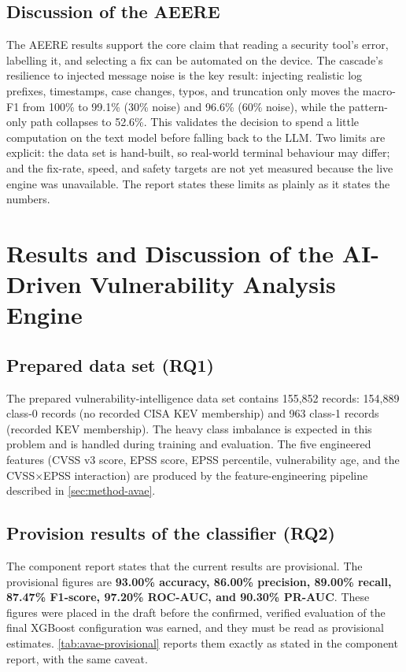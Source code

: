 \subsection{Discussion of the AEERE}\label{sec:results-aeere-discussion}

The AEERE results support the core claim that reading a security tool's error,
labelling it, and selecting a fix can be automated on the device. The cascade's
resilience to injected message noise is the key result: injecting realistic
log prefixes, timestamps, case changes, typos, and truncation only moves the
macro-F1 from 100\% to 99.1\% (30\% noise) and 96.6\% (60\% noise), while the
pattern-only path collapses to 52.6\%. This validates the decision to spend a
little computation on the text model before falling back to the LLM. Two limits
are explicit: the data set is hand-built, so real-world terminal behaviour may
differ; and the fix-rate, speed, and safety targets are not yet measured because
the live engine was unavailable. The report states these limits as plainly as it
states the numbers.

\section{Results and Discussion of the AI-Driven Vulnerability Analysis Engine}\label{sec:results-avae}

\subsection{Prepared data set (RQ1)}\label{sec:results-avae-dataset}

The prepared vulnerability-intelligence data set contains 155,852 records:
154,889 class-0 records (no recorded CISA KEV membership) and 963 class-1
records (recorded KEV membership). The heavy class imbalance is expected in
this problem and is handled during training and evaluation. The five engineered
features (CVSS v3 score, EPSS score, EPSS percentile, vulnerability age, and the
CVSS$\times$EPSS interaction) are produced by the feature-engineering pipeline
described in \cref{sec:method-avae}.

\subsection{Provision results of the classifier (RQ2)}\label{sec:results-avae-model}

The component report states that the current results are provisional. The
provisional figures are \textbf{93.00\% accuracy, 86.00\% precision, 89.00\%
recall, 87.47\% F1-score, 97.20\% ROC-AUC, and 90.30\% PR-AUC}. These figures
were placed in the draft before the confirmed, verified evaluation of the final
XGBoost configuration was earned, and they must be read as provisional
estimates. \cref{tab:avae-provisional} reports them exactly as stated in the
component report, with the same caveat.

